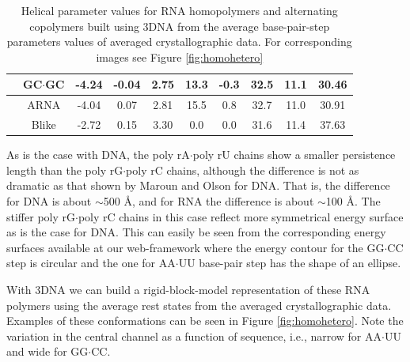 \begin{table}[htbp]
{\begin{tabular}{|l|c|c|c|c|c|c|c|c|c|}
 & GC$\cdot$GC & -4.24 & -0.04 & 2.75 & 13.3 & -0.3 & 32.5 & 11.1 & 30.46 \\ \hline
 & ARNA & -4.04 & 0.07 & 2.81 & 15.5 & 0.8 & 32.7 & 11.0 & 30.91 \\ 
 & Blike & -2.72 & 0.15 & 3.30 & 0.0 & 0.0 & 31.6 & 11.4 & 37.63 \\ \hline
\end{tabular}
\caption{Helical parameter values for RNA homopolymers and alternating
  copolymers  built   using  3DNA  from   the  average  base-pair-step
  parameters   values   of   averaged  crystallographic   data.    For
  corresponding images see Figure \ref{fig:homohetero}}
\label{tab:helicalprop}
}
\end{table}


As  is the  case with  DNA, the  poly rA$\cdot$poly  rU chains  show a
smaller  persistence length  than  the poly  rG$\cdot$poly rC  chains,
although the difference is not as dramatic as that shown by Maroun and
Olson \cite{maroun1988a} for  DNA. That is, the difference  for DNA is
about $\sim$500  \AA, and  for RNA the  difference is  about $\sim$100
\AA.  The  stiffer poly rG$\cdot$poly  rC chains in this  case reflect
more  symmetrical energy  surface as  is the  case for  DNA.  This can
easily be seen from the corresponding energy surfaces available at our
web-framework  where the energy  contour for  the GG$\cdot$CC  step is
circular and the  one for AA$\cdot$UU base-pair step  has the shape of
an ellipse.

With 3DNA we can build a rigid-block-model representation of these RNA
polymers   using   the  average   rest   states   from  the   averaged
crystallographic data. Examples of  these conformations can be seen in
Figure \ref{fig:homohetero}. Note the variation in the central channel
as a function  of sequence, i.e., narrow for  AA$\cdot$UU and wide for
GG$\cdot$CC.

